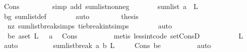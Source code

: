 \begin{isabellebody}
\ Cons\ \isanewline
\ \ \ \ \ \ \isamarkupfalse%
\ {\isacharparenleft}{\kern0pt}simp\ add{\isacharcolon}{\kern0pt}\ sum{\isacharunderscore}{\kern0pt}list{\isacharunderscore}{\kern0pt}nonneg{\isacharparenright}{\kern0pt}\isanewline
\ \ \ \ \isamarkupfalse%
\ \isamarkupfalse%
\ {\isachardoublequoteopen}sum{\isacharunderscore}{\kern0pt}list\ {\isacharparenleft}{\kern0pt}a{}\ {\isacharhash}{\kern0pt}\ L{\isacharparenright}{\kern0pt}\ {\isachargreater}{\kern0pt}\ {}{\isachardoublequoteclose}\ \isamarkupfalse%
\ bg\ sum{\isacharunderscore}{\kern0pt}list{\isacharunderscore}{\kern0pt}def\isanewline
\ \ \ \ \ \ \isamarkupfalse%
\ auto\ \isanewline
\ \ \ \ \isamarkupfalse%
\ \isamarkupfalse%
\ {\isacharquery}{\kern0pt}thesis\ \isamarkupfalse%
\ \ nz\ sumlist{\isacharunderscore}{\kern0pt}break{\isachardot}{\kern0pt}simps\ tie{\isacharunderscore}{\kern0pt}break{\isacharunderscore}{\kern0pt}int{\isachardot}{\kern0pt}simps\isanewline
\ \ \ \ \ \ \isamarkupfalse%
\ auto\ \isanewline
\ \ \ \ \isamarkupfalse%
\isanewline
\ \ \ \ \ \ \isamarkupfalse%
\ {}\isanewline
\ \ \ \ \ \ \isamarkupfalse%
\ \isamarkupfalse%
\ \ be{\isacharcolon}{\kern0pt}\ {\isachardoublequoteopen}{\isasymexists}a{\isasymin}set\ L{\isachardot}{\kern0pt}\ {}\ {\isacharless}{\kern0pt}\ a{\isachardoublequoteclose}\ \isamarkupfalse%
\ Cons\isanewline
\ \ \ \ \ \ \ \ \isamarkupfalse%
\ {\isacharparenleft}{\kern0pt}metis\ less{\isacharunderscore}{\kern0pt}int{\isacharunderscore}{\kern0pt}code{\isacharparenleft}{\kern0pt}{}{\isacharparenright}{\kern0pt}\ set{\isacharunderscore}{\kern0pt}ConsD{\isacharparenright}{\kern0pt}\ \isanewline
\ \ \ \ \ \ \isamarkupfalse%
\ \isamarkupfalse%
\ {\isachardoublequoteopen}L\ {\isasymnoteq}\ {\isacharbrackleft}{\kern0pt}{\isacharbrackright}{\kern0pt}{\isachardoublequoteclose}\ \isamarkupfalse%
\ auto\isanewline
\ \ \ \ \ \ \isamarkupfalse%
\ \isamarkupfalse%
\ {\isachardoublequoteopen}sumlist{\isacharunderscore}{\kern0pt}break\ a\ b\ L\ {\isacharequal}{\kern0pt}\ {}{\isachardoublequoteclose}\ \ \isamarkupfalse%
\ Cons\ be\isanewline
\ \ \ \ \ \ \ \ \isamarkupfalse%
\ auto\ \isanewline
\ \ \ \ \ \ \isamarkupfalse%
\ \isamarkupfalse%

\end{isabellebody}
